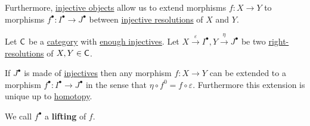 \documentclass[../../main]{subfiles}
\begin{document}
Furthermore, \hyperref[def:injective-projective-object]{injective objects} allow us to extend morphisms \(f\colon X \to Y\) to morphisms \(f^{\bullet}\colon I^{\bullet} \to J^{\bullet}\) between \hyperref[def:resolution]{injective resolutions} of \(X\) and \(Y\).
\begin{theorem}\label{thm:existence-of-lifting}
  Let \(\mathsf{C}\) be a \hyperref[def:category]{category} with \hyperref[def:enough-injectives-projectives]{enough injectives}.
  Let \(X \xrightarrow{\varepsilon} I^{\bullet}, Y \xrightarrow{\eta} J^{\bullet}\) be two \hyperref[def:resolution]{right-resolutions} of \(X, Y \in \mathsf{C}\).

  If \(J^{\bullet}\) is made of \hyperref[def:injective-projective-object]{injectives} then any morphism \(f\colon X \to Y\) can be extended to a morphism \(f^{\bullet}\colon I^{\bullet} \to J^{\bullet}\) in the sense that \(\eta \circ f^{0} = f \circ \varepsilon\).
  Furthermore this extension is unique up to \hyperref[def:homotopy]{homotopy}.

  We call \(f^{\bullet}\) a \textbf{lifting} of \(f\).
\end{theorem}
\end{document}
